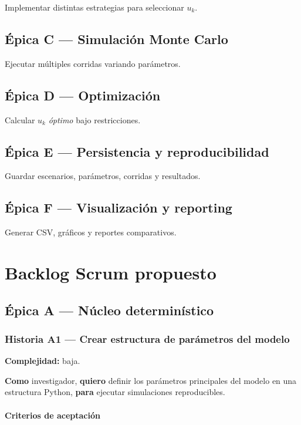 \documentclass[11pt,a4paper]{article}
\begin{document}
Implementar distintas estrategias para seleccionar $u_k$.

\subsection{\'Epica C --- Simulaci\'on Monte Carlo}

Ejecutar m\'ultiples corridas variando par\'ametros.

\subsection{\'Epica D --- Optimizaci\'on}

Calcular $u_k$ \textit{\'optimo} bajo restricciones.

\subsection{\'Epica E --- Persistencia y reproducibilidad}

Guardar escenarios, par\'ametros, corridas y resultados.

\subsection{\'Epica F --- Visualizaci\'on y reporting}

Generar CSV, gr\'aficos y reportes comparativos.

\section{Backlog Scrum propuesto}

\subsection{\'Epica A --- N\'ucleo determin\'istico}

\subsubsection{Historia A1 --- Crear estructura de par\'ametros del modelo}

\textbf{Complejidad:} baja.

\textbf{Como} investigador, \textbf{quiero} definir los par\'ametros principales del modelo en una estructura Python, \textbf{para} ejecutar simulaciones reproducibles.

\paragraph{Criterios de aceptaci\'on}
\end{document}
